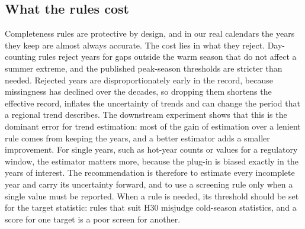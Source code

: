 \documentclass[draft]{agujournal2025}
\begin{document}
\subsection{What the rules cost}
Completeness rules are protective by design, and in our real calendars the years they keep are almost always accurate. The cost lies in what they reject. Day-counting rules reject years for gaps outside the warm season that do not affect a summer extreme, and the published peak-season thresholds are stricter than needed. Rejected years are disproportionately early in the record, because missingness has declined over the decades, so dropping them shortens the effective record, inflates the uncertainty of trends and can change the period that a regional trend describes. The downstream experiment shows that this is the dominant error for trend estimation: most of the gain of estimation over a lenient rule comes from keeping the years, and a better estimator adds a smaller improvement. For single years, such as hot-year counts or values for a regulatory window, the estimator matters more, because the plug-in is biased exactly in the years of interest. The recommendation is therefore to estimate every incomplete year and carry its uncertainty forward, and to use a screening rule only when a single value must be reported. When a rule is needed, its threshold should be set for the target statistic: rules that suit H30 misjudge cold-season statistics, and a score for one target is a poor screen for another.
\end{document}
